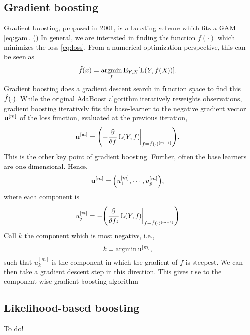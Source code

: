 \subsection{Gradient boosting}
Gradient boosting, proposed in 2001, is a boosting scheme which fits a GAM \eqref{eq:gam}. (\cite{friedman2001}) In general, we are interested in finding the function $f(\cdot)$ which minimizes the loss \eqref{eq:loss}. From a numerical optimization perspective, this can be seen as
\begin{equation*}
    \hat{f}(x)=\underset{f}{\operatorname{argmin}}\,{\operatorname{E}_{Y,X}[\operatorname{L}(Y,f(X))]}.
\end{equation*}
Gradient boosting does a gradient descent search in function space to find this $\hat{f}(\cdot)$. While the original AdaBoost algorithm iteratively reweights observations, gradient boosting iteratively fits the base-learner to the negative gradient vector $\mathbf{u}^{[m]}$ of the loss function, evaluated at the previous iteration,
\begin{equation*}
    \u^{[m]}=\p*{-\frac{\pd}{\pd f}\loss(Y,f)\at_{f=\fh(\cdot)^{[m-1]}}}.
\end{equation*}
This is the other key point of gradient boosting. Further, often the base learners are one dimensional. Hence,
\begin{equation*}
    \u^{[m]}=\p*{u_1^{[m]},\cdots,u_p^{[m]}},
\end{equation*}
where each component is
\begin{equation*}
    u_j^{[m]}=-\p*{\frac{\pd}{\pd f_j}\loss(Y,f)\at_{f=\fh(\cdot)^{[m-1]}}}
\end{equation*}
Call $k$ the component which is most negative, i.e.,
\begin{equation*}
    k=\operatorname{argmin}{\mathbf{u}^{[m]}},
\end{equation*}
such that $u_k^{[m]}$ is the component in which the gradient of $f$ is steepest. We can then take a gradient descent step in this direction. This gives rise to the component-wise gradient boosting algorithm.

\subsection{Likelihood-based boosting}
To do!


